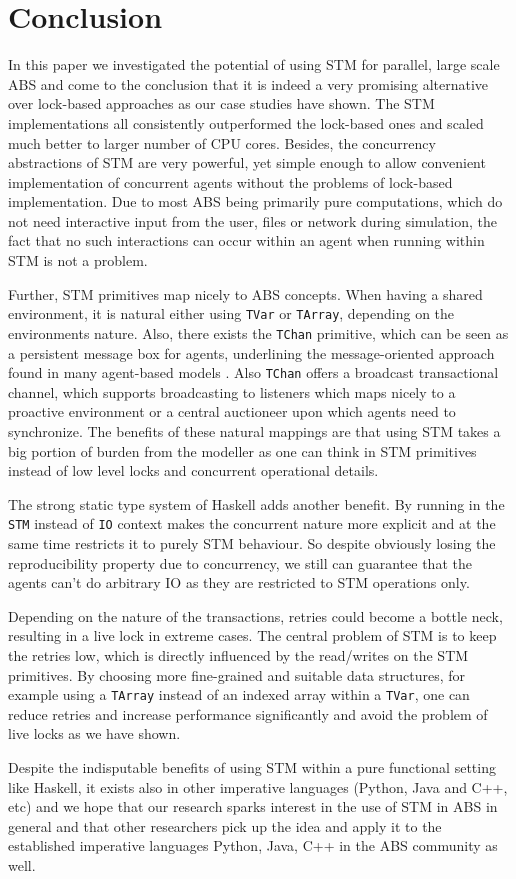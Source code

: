 \section{Conclusion} %
\label{sec:conclusion}

In this paper we investigated the potential of using STM for parallel, large scale ABS and come to the conclusion that it is indeed a very promising alternative over lock-based approaches as our case studies have shown. The STM implementations all consistently outperformed the lock-based ones and scaled much better to larger number of CPU cores. Besides, the concurrency abstractions of STM are very powerful, yet simple enough to allow convenient implementation of concurrent agents without the problems of lock-based implementation. Due to most ABS being primarily pure computations, which do not need interactive input from the user, files or network during simulation, the fact that no such interactions can occur within an agent when running within STM is not a problem. 

Further, STM primitives map nicely to ABS concepts. When having a shared environment, it is natural either using \texttt{TVar} or \texttt{TArray}, depending on the environments nature. Also, there exists the \texttt{TChan} primitive, which can be seen as a persistent message box for agents, underlining the message-oriented approach found in many agent-based models \cite{agha_actors:_1986, wooldridge_introduction_2009}. Also \texttt{TChan} offers a broadcast transactional channel, which supports broadcasting to listeners which maps nicely to a proactive environment or a central auctioneer upon which agents need to synchronize. The benefits of these natural mappings are that using STM takes a big portion of burden from the modeller as one can think in STM primitives instead of low level locks and concurrent operational details. 

The strong static type system of Haskell adds another benefit. By running in the \texttt{STM} instead of \texttt{IO} context makes the concurrent nature more explicit and at the same time restricts it to purely STM behaviour. So despite obviously losing the reproducibility property due to concurrency, we still can guarantee that the agents can't do arbitrary IO as they are restricted to STM operations only.

Depending on the nature of the transactions, retries could become a bottle neck, resulting in a live lock in extreme cases. The central problem of STM is to keep the retries low, which is directly influenced by the read/writes on the STM primitives. By choosing more fine-grained and suitable data structures, for example using a \texttt{TArray} instead of an indexed array within a \texttt{TVar}, one can reduce retries and increase performance significantly and avoid the problem of live locks as we have shown.

Despite the indisputable benefits of using STM within a pure functional setting like Haskell, it exists also in other imperative languages (Python, Java and C++, etc) and we hope that our research sparks interest in the use of STM in ABS in general and that other researchers pick up the idea and apply it to the established imperative languages Python, Java, C++ in the ABS community as well.